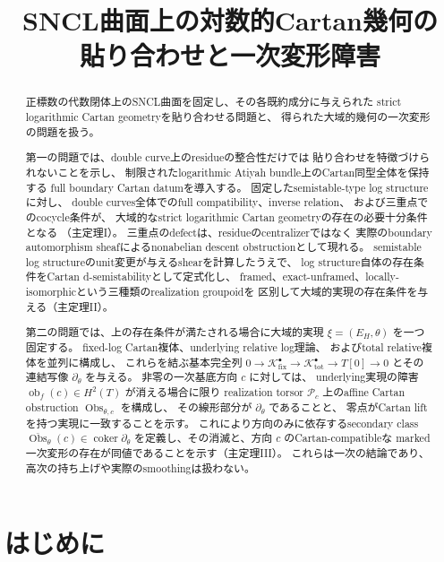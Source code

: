 \documentclass[uplatex,dvipdfmx,11pt]{jsarticle}
\title{SNCL曲面上の対数的Cartan幾何の\\
貼り合わせと一次変形障害}
\author{}
\date{}
\numberwithin{equation}{section}
\theoremstyle{plain}
\theoremstyle{definition}
\theoremstyle{remark}
\DeclareMathOperator{\coker}{coker}
\begin{document}
\maketitle

\begin{abstract}
正標数の代数閉体上のSNCL曲面を固定し、その各既約成分に与えられた
strict logarithmic Cartan geometryを貼り合わせる問題と、
得られた大域的幾何の一次変形の問題を扱う。

第一の問題では、double curve上のresidueの整合性だけでは
貼り合わせを特徴づけられないことを示し、
制限されたlogarithmic Atiyah bundle上のCartan同型全体を保持する
full boundary Cartan datumを導入する。
固定したsemistable-type log structureに対し、
double curves全体でのfull compatibility、inverse relation、
および三重点でのcocycle条件が、
大域的なstrict logarithmic Cartan geometryの存在の必要十分条件となる
（主定理I）。
三重点のdefectは、residueのcentralizerではなく
実際のboundary automorphism sheafによるnonabelian descent obstructionとして現れる。
semistable log structureのunit変更が与えるshearを計算したうえで、
log structure自体の存在条件をCartan d-semistabilityとして定式化し、
framed、exact-unframed、locally-isomorphicという三種類のrealization groupoidを
区別して大域的実現の存在条件を与える（主定理II）。

第二の問題では、上の存在条件が満たされる場合に大域的実現
\(\xi=(E_H,\theta)\) を一つ固定する。
fixed-log Cartan複体、underlying relative log理論、
およびtotal relative複体を並列に構成し、
これらを結ぶ基本完全列
\(0\to\mathcal K_{\mathrm{fix}}^\bullet\to\mathcal K_{\mathrm{tot}}^\bullet\to T[0]\to0\)
とその連結写像 \(\partial_\theta\) を与える。
非零の一次基底方向 \(c\) に対しては、
underlying実現の障害 \(\operatorname{ob}_f(c)\in H^2(T)\) が消える場合に限り
realization torsor \(\mathcal P_c\) 上のaffine Cartan obstruction
\(\operatorname{Obs}_{\theta,c}\) を構成し、
その線形部分が \(\partial_\theta\) であることと、
零点がCartan liftを持つ実現に一致することを示す。
これにより方向のみに依存するsecondary class
\(\overline{\operatorname{Obs}}_\theta(c)\in\coker\partial_\theta\)
を定義し、その消滅と、方向 \(c\) のCartan-compatibleな
marked一次変形の存在が同値であることを示す（主定理III）。
これらは一次の結論であり、高次の持ち上げや実際のsmoothingは扱わない。
\end{abstract}

\tableofcontents

\section{はじめに}
\label{sec:introduction}
\end{document}

